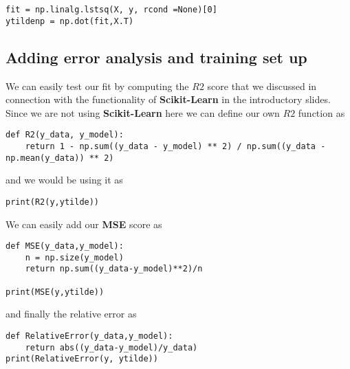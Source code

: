 \documentclass[%
oneside,                 %
final,                   %
10pt]{article}
\begin{document}
\begin{verbatim}
fit = np.linalg.lstsq(X, y, rcond =None)[0]
ytildenp = np.dot(fit,X.T)

\end{verbatim}


\subsection*{Adding error analysis and training set up}

We can easily test our fit by computing the $R2$ score that we discussed in connection with the functionality of \textbf{Scikit-Learn} in the introductory slides.
Since we are not using \textbf{Scikit-Learn} here we can define our own $R2$ function as



\begin{verbatim}
def R2(y_data, y_model):
    return 1 - np.sum((y_data - y_model) ** 2) / np.sum((y_data - np.mean(y_data)) ** 2)

\end{verbatim}

and we would be using it as 


\begin{verbatim}
print(R2(y,ytilde))

\end{verbatim}


We can easily add our \textbf{MSE} score as






\begin{verbatim}
def MSE(y_data,y_model):
    n = np.size(y_model)
    return np.sum((y_data-y_model)**2)/n

print(MSE(y,ytilde))

\end{verbatim}

and finally the relative error as




\begin{verbatim}
def RelativeError(y_data,y_model):
    return abs((y_data-y_model)/y_data)
print(RelativeError(y, ytilde))

\end{verbatim}
\end{document}
